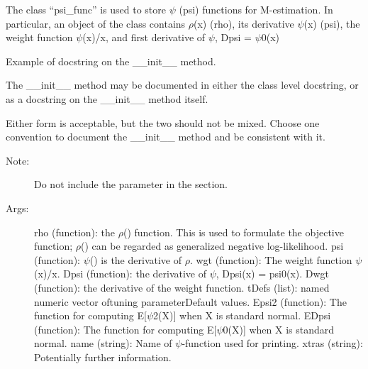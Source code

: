 \documentclass[letterpaper,10pt,english]{sphinxmanual}
\begin{document}
\begin{fulllineitems}
\label{\detokenize{_modules/lmrob:lmrob.utils.psi_func}}
The class “psi\_func” is used to store \(\psi\) (psi) functions for M-estimation. In particular, an object of the class contains \(\rho\)(x) (rho), its derivative \(\psi\)(x) (psi), the weight function \(\psi\)(x)/x, and ﬁrst derivative of \(\psi\), Dpsi = \(\psi\)0(x)

\begin{fulllineitems}
\label{\detokenize{_modules/lmrob:lmrob.utils.psi_func.__init__}}
Example of docstring on the \_\_init\_\_ method.

The \_\_init\_\_ method may be documented in either the class level
docstring, or as a docstring on the \_\_init\_\_ method itself.

Either form is acceptable, but the two should not be mixed. Choose one
convention to document the \_\_init\_\_ method and be consistent with it.
\begin{description}
\item[{Note:}] \leavevmode
Do not include the  parameter in the  section.

\item[{Args:}] \leavevmode
rho (function): the \(\rho\)() function. This is used to formulate the objective function; \(\rho\)() can be regarded as generalized negative log-likelihood.
psi (function): \(\psi\)() is the derivative of \(\rho\).
wgt (function): The weight function \(\psi\)(x)/x.
Dpsi (function): the derivative of \(\psi\), Dpsi(x) = psi0(x).
Dwgt (function): the derivative of the weight function.
tDefs (list): named numeric vector oftuning parameterDefault values.
Epsi2 (function): The function for computing E{[}\(\psi\)2(X){]} when X is standard normal.
EDpsi (function): The function for computing E{[}\(\psi\)0(X){]} when X is standard normal.
name (string): Name of \(\psi\)-function used for printing.
xtras (string): Potentially further information.

\end{description}

\end{fulllineitems}


\end{fulllineitems}
\end{document}
